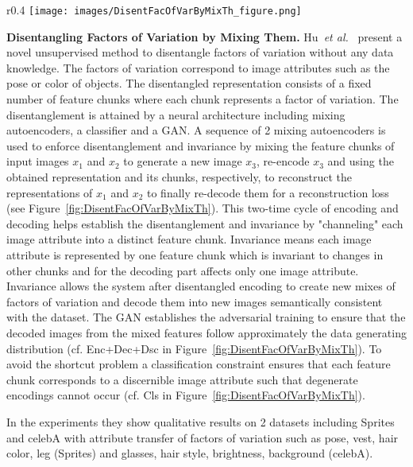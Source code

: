 \documentclass[a4paper,12pt]{report}
\begin{document}
\begin{wrapfigure}{r}{0.4\textwidth}
\texttt{[image: images/DisentFacOfVarByMixTh\_figure.png]} 
\caption{Architecture by Hu~\textit{et al.}~\cite{DisentFacOfVarByMixTh}.}
\label{fig:DisentFacOfVarByMixTh}
\end{wrapfigure}
\par \textbf{Disentangling Factors of Variation by Mixing Them.} Hu~\textit{et al.}~\cite{DisentFacOfVarByMixTh} present a novel unsupervised method to disentangle factors of variation without any data knowledge. The factors of variation correspond to image attributes such as the pose or color of objects. The disentangled representation consists of a fixed number of feature chunks where each chunk represents a factor of variation. The disentanglement is attained by a neural architecture including mixing autoencoders, a classifier and a GAN. A sequence of 2 mixing autoencoders is used to enforce disentanglement and invariance by mixing the feature chunks of input images $x_1$ and $x_2$ to generate a new image $x_3$, re-encode $x_3$ and using the obtained representation and its chunks, respectively, to reconstruct the representations of $x_1$ and $x_2$ to finally re-decode them for a reconstruction loss (see Figure~\ref{fig:DisentFacOfVarByMixTh}). This two-time cycle of encoding and decoding helps establish the disentanglement and invariance by "channeling" each image attribute into a distinct feature chunk. Invariance means each image attribute is represented by one feature chunk which is invariant to changes in other chunks and for the decoding part affects only one image attribute. Invariance allows the system after disentangled encoding to create new mixes of factors of variation and decode them into new images semantically consistent with the dataset. The GAN establishes the adversarial training to ensure that the decoded images from the mixed features follow approximately the data generating distribution (cf. Enc+Dec+Dsc in Figure~\ref{fig:DisentFacOfVarByMixTh}). To avoid the shortcut problem a classification constraint ensures that each feature chunk corresponds to a discernible image attribute such that degenerate encodings cannot occur (cf. Cls in Figure~\ref{fig:DisentFacOfVarByMixTh}).


In the experiments they show qualitative results on 2 datasets including Sprites and celebA with attribute transfer of factors of variation such as pose, vest, hair color, leg (Sprites) and glasses, hair style, brightness, background (celebA).
\end{document}
